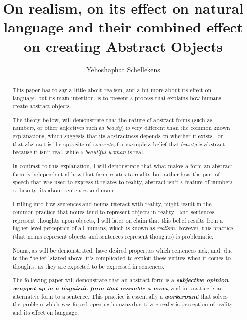 \documentclass[10pt]{article}
\begin{document}
\title{On realism,
on its effect on natural language
and their combined effect on creating Abstract Objects}
\author{Yehoshaphat Schellekens}
\maketitle

\begin{abstract}
\par
This paper has to say a little about realism, and a bit more about its effect on  language. but its main intention, is to present a process that explains how humans create abstract objects. \par
The theory bellow, will demonstrate that  the nature of abstract forms (such as numbers, or other adjectives such as \textit{beauty}) is very different than the common known explanations, which suggests that its abstractness depends on whether it exists , or that abstract is the opposite of \textit{concrete}, for example a belief that \textit{beauty}  is abstract because it isn't real, while a \textit{beautiful woman} is real. \par
In contrast to this explanation, I will demonstrate that what makes a form an abstract form is independent of how that form relates to reality but rather how the part of speech that was used to express it relates to reality, abstract isn’t a feature of numbers or  beauty, its about sentences and nouns. \par
Drilling into how sentences and nouns interact with reality, might result in the common practice  that nouns tend to represent objects in reality , and sentences represent  thoughts upon objects, I will later on claim that this belief results from a higher level  perception of all humans, which is known as \textit{realism}. however, this practice (that nouns represent objects and   sentences  represent thoughts) is problematic. \par
Nouns, as will be demonstrated, have desired properties which sentences lack, and, due to the “belief” stated above, it's complicated to exploit these virtues when it comes to thoughts, as they are expected to be expressed in sentences. \par
The following paper will demonstrate that an abstract form is a \textbf{\textit{subjective opinion wrapped up in a linguistic form that resemble a noun}}, and in practice is an alternative form to a sentence. This practice is essentially a \textbf{\textit{workaround}} that solves the problem which was forced open us humans due to are realistic perception of reality and its effect on language.
\end{abstract}
\end{document}
